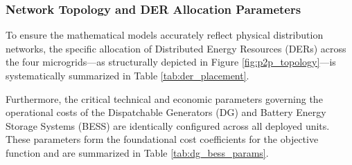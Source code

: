\subsubsection{Network Topology and DER Allocation Parameters}
To ensure the mathematical models accurately reflect physical distribution networks, the specific allocation of Distributed Energy Resources (DERs) across the four microgrids---as structurally depicted in Figure \ref{fig:p2p_topology}---is systematically summarized in Table \ref{tab:der_placement}.

\begin{table}[htbp]
    \centering
    \caption{Placement of Distributed Energy Resources across Microgrids}
    \label{tab:der_placement}
\end{table}

Furthermore, the critical technical and economic parameters governing the operational costs of the Dispatchable Generators (DG) and Battery Energy Storage Systems (BESS) are identically configured across all deployed units. These parameters form the foundational cost coefficients for the objective function and are summarized in Table \ref{tab:dg_bess_params}.


